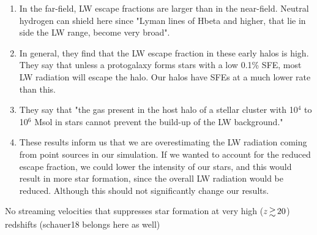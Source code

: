 \documentclass[a4paper,fleqn,usenatbib]{mnras}
\begin{document}
\begin{enumerate}
	\item In the far-field, LW escape fractions are larger than in the near-field. Neutral hydrogen can shield here since "Lyman lines of Hbeta and higher, that lie in side the LW range, become very broad". 
	\item In general, they find that the LW escape fraction in these early halos is high. They say that unless a protogalaxy forms stars with a low 0.1\% SFE, most LW radiation will escape the halo. Our halos have SFEs at a much lower rate than this.
	\item They say that "the gas present in the host halo of a stellar cluster with 10$^{4}$ to 10$^{6}$ Msol in stars cannot prevent the build-up of the LW background."
	\item These results inform us that we are overestimating the LW radiation coming from point sources in our simulation. If we wanted to account for the reduced escape fraction, we could lower the intensity of our stars, and this would result in more star formation, since the overall LW radiation would be reduced. Although this should not significantly change our results.
\end{enumerate}

\li No streaming velocities that suppresses star formation at very
high ($z \ga 20$) redshifts \citep{Tselia11, Greif11_Delay, Naoz12, OLeary12} (schauer18 belongs here as well)
\end{document}
